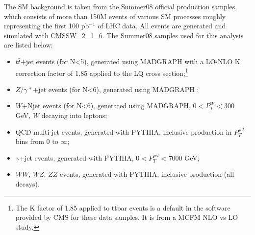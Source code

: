  


%


The SM background is taken from the Summer08 official production samples,
which consists of more than 150M events of various SM processes roughly representing the first 100 pb$^{-1}$ of LHC data.
All events are generated and simulated with CMSSW\_2\_1\_6. 
The Summer08 samples used for this analysis are listed below:
\begin{itemize}
%
\item $t\bar{t}$+jet events (for N<5), generated using MADGRAPH \cite{Mangano:2002ea} with a 
LO-NLO K correction factor of 1.85 applied 
to the LQ cross section;\footnote{The K factor of 1.85 applied to ttbar events is a default in the software provided by CMS for 
 these data samples.  It is from a MCFM NLO vs LO study.}
%
\item $Z/\gamma*$+jet events (for N<6), generated using MADGRAPH
;  
%
\item $W$+Njet events (for N<6), generated using MADGRAPH, $ 0 < P_{T}^{W} < 300 $ GeV, $W$ decaying into leptons;  
%
\item QCD multi-jet events, generated with PYTHIA, inclusive production in $P_{T}^{jet}$ bins from 0 to $\infty$;  
%
\item $\gamma$+jet events, generated with PYTHIA, $ 0 < P_{T}^{jet} < 7000 $ GeV;  
%
\item $WW$, $WZ$, $ZZ$ events, generated with PYTHIA, inclusive production (all decays).
\end{itemize} 

